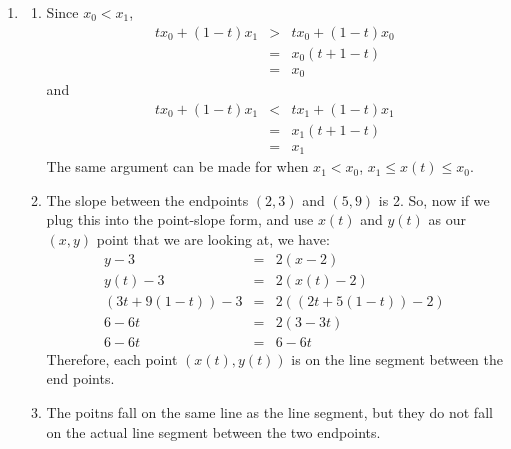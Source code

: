\documentclass{article}
\begin{document}
\begin{enumerate}
\item 
\begin{enumerate}
	\item Since $x_0 < x_1$, 
	\begin{eqnarray*}
		tx_0 + (1-t)x_1 &>& tx_0 + (1-t)x_0\\
		&=& x_0(t+1-t)\\
		&=& x_0
	\end{eqnarray*}
	and 
	\begin{eqnarray*}
		tx_0 + (1-t)x_1 &<& tx_1 + (1-t)x_1\\
		&=& x_1(t+1-t)\\
		&=& x_1
	\end{eqnarray*}
The same argument can be made for when $x_1 < x_0$, $x_1 \leq x(t) \leq x_0$. 
	\item The slope between the endpoints $(2, 3)$ and $(5, 9)$ is 2. So, now if we plug this into the point-slope form, and use $x(t)$ and $y(t)$ as our $(x, y)$ point that we are looking at, we have:
	\begin{eqnarray*}
		y - 3 &=& 2(x-2)\\
		y(t) - 3 &=& 2(x(t) - 2)\\
		(3t + 9(1-t)) - 3 &=& 2((2t + 5(1-t))-2)\\
		6-6t &=& 2(3 - 3t)\\
		6 - 6t &=& 6-6t
	\end{eqnarray*}
	Therefore, each point $(x(t), y(t))$ is on the line segment between the end points. 
	\item The poitns fall on the same line as the line segment, but they do not fall on the actual line segment between the two endpoints. 
	\end{enumerate}


\end{enumerate}
\end{document}
